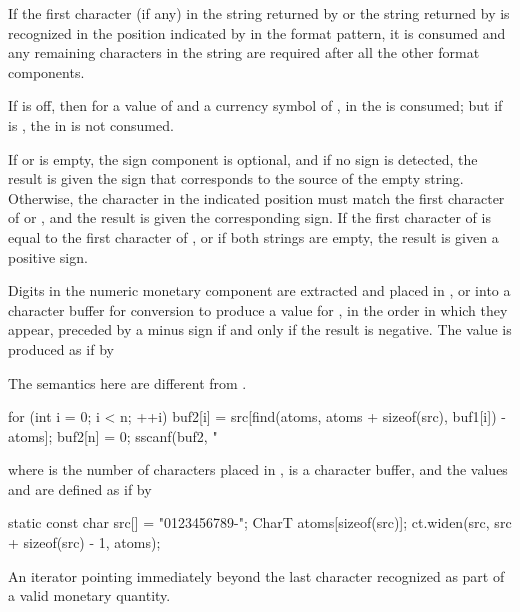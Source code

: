 \begin{itemdescr}
\pnum
If the first character (if any) in
the string  returned by  or
the string  returned by 
is recognized in the position indicated by  in the format pattern,
it is consumed and
any remaining characters in the string are required
after all the other format components.
\begin{example}
If  is off,
then for a  value of  and
a currency symbol of ,
in  the  is consumed;
but if  is ,
the  in  is not consumed.
\end{example}
If  or  is empty,
the sign component is optional, and
if no sign is detected,
the result is given the sign that corresponds to the source of the empty string.
Otherwise,
the character in the indicated position must match
the first character of  or ,
and the result is given the corresponding sign.
If the first character of  is equal to
the first character of ,
or if both strings are empty,
the result is given a positive sign.

\pnum
Digits in the numeric monetary component are extracted and
placed in , or into a character buffer 
for conversion to produce a value for ,
in the order in which they appear,
preceded by a minus sign if and only if the result is negative.
The value  is produced as if by
\begin{footnote}
The semantics here are different from .
\end{footnote}
\begin{codeblock}
for (int i = 0; i < n; ++i)
  buf2[i] = src[find(atoms, atoms + sizeof(src), buf1[i]) - atoms];
buf2[n] = 0;
sscanf(buf2, "%
\end{codeblock}
where  is the number of characters placed in ,
 is a character buffer, and
the values  and  are defined as if by
\begin{codeblock}
static const char src[] = "0123456789-";
CharT atoms[sizeof(src)];
ct.widen(src, src + sizeof(src) - 1, atoms);
\end{codeblock}

\pnum
\returns
An iterator pointing immediately beyond
the last character recognized as part of a valid monetary quantity.
\end{itemdescr}

